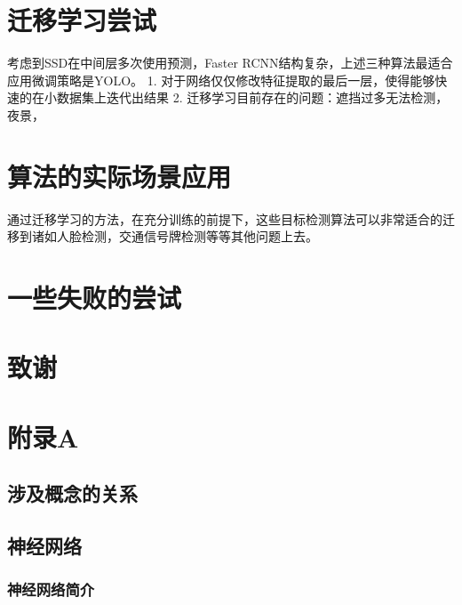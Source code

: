 \documentclass[12pt,a4paper,titlepage]{article}
\begin{document}
\section{迁移学习尝试}
考虑到SSD在中间层多次使用预测，Faster RCNN结构复杂，上述三种算法最适合应用微调策略是YOLO。
1. 对于网络仅仅修改特征提取的最后一层，使得能够快速的在小数据集上迭代出结果
2. 迁移学习目前存在的问题：遮挡过多无法检测，夜景，


\section{算法的实际场景应用}
通过迁移学习的方法，在充分训练的前提下，这些目标检测算法可以非常适合的迁移到诸如人脸检测，交通信号牌检测等等其他问题上去。

\section{一些失败的尝试}


\section*{致谢}


\newpage
\renewcommand\refname{\zihao{-2} 参考文献}


\newpage
\section*{附录A}

\subsection*{涉及概念的关系}


\subsection*{神经网络}
\subsubsection*{神经网络简介}
\end{document}
